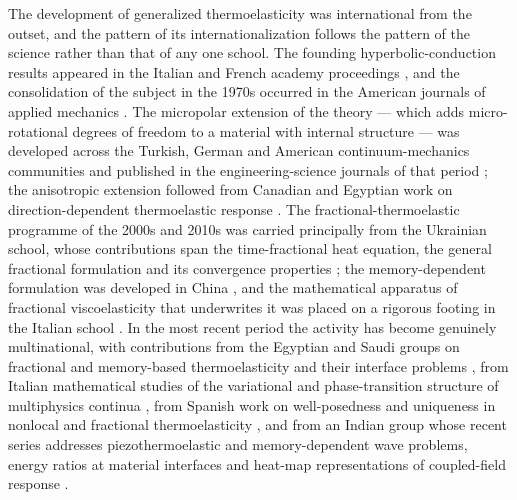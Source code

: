 The development of generalized thermoelasticity was international from the outset, and the pattern of its internationalization follows the pattern of the science rather than that of any one school. The founding hyperbolic-conduction results appeared in the Italian and French academy proceedings \cite{Cattaneo1948,Vernotte1958}, and the consolidation of the subject in the 1970s occurred in the American journals of applied mechanics \cite{Biot1956,Lord1967,Green1972,Green1991,Green1993,Tzou1995}. The micropolar extension of the theory --- which adds micro-rotational degrees of freedom to a material with internal structure --- was developed across the Turkish, German and American continuum-mechanics communities and published in the engineering-science journals of that period \cite{Eringen1966a,Eringen1968b,Eringen1972}; the anisotropic extension followed from Canadian and Egyptian work on direction-dependent thermoelastic response \cite{Dhaliwal1980,Sharma2022}. The fractional-thermoelastic programme of the 2000s and 2010s was carried principally from the Ukrainian school, whose contributions span the time-fractional heat equation, the general fractional formulation and its convergence properties \cite{Povstenko2004,Povstenko2007,Povstenko2009,Povstenko2011,Povstenko2016}; the memory-dependent formulation was developed in China \cite{Wang2011}, and the mathematical apparatus of fractional viscoelasticity that underwrites it was placed on a rigorous footing in the Italian school \cite{Gorenflo1997,Luchko2010}. In the most recent period the activity has become genuinely multinational, with contributions from the Egyptian and Saudi groups on fractional and memory-based thermoelasticity and their interface problems \cite{Abouelregal2023,Sharma2022}, from Italian mathematical studies of the variational and phase-transition structure of multiphysics continua \cite{Marotti2013}, from Spanish work on well-posedness and uniqueness in nonlocal and fractional thermoelasticity \cite{Quintanilla2019}, and from an Indian group whose recent series addresses piezothermoelastic and memory-dependent wave problems, energy ratios at material interfaces and heat-map representations of coupled-field response \cite{Barak2023,Barak2023IJP,Barak2023JTS,Barak2023MMMS,Gupta2023Energy,Gupta2023IJNMF,Kumar2023PhysScr,Gupta2026HeatMap}.

